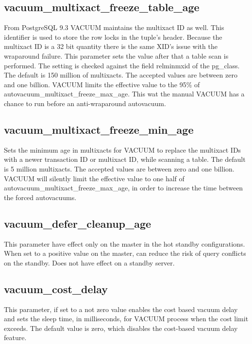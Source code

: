 \subsection{vacuum\_multixact\_freeze\_table\_age}
From PostgreSQL 9.3 VACUUM maintains the multixact ID as well. This identifier is used to store the 
row locks in the tuple's header.  Because the multixact ID is a 32 bit quantity there 
is the same XID's issue with the wraparound failure. This parameter 
sets the value after that a table scan is performed. The setting is checked against the field relminmxid of 
the pg\_class. The default is 150 million of multixacts. The accepted values are between zero and one 
billion. VACUUM limits the effective value to the 95\% of autovacuum\_multixact\_freeze\_max\_age. This wat 
the manual VACUUM has a chance to run before an anti-wraparound autovacuum.

\subsection{vacuum\_multixact\_freeze\_min\_age}
Sets the minimum age in multixacts for VACUUM to replace the multixact IDs with a newer transaction ID or 
multixact ID, while scanning a table. The default is 5 million multixacts. The accepted values 
are between zero and one billion. VACUUM will silently limit the effective value to one half of 
autovacuum\_multixact\_freeze\_max\_age, in order to increase the time between the forced autovacuums.

\subsection{vacuum\_defer\_cleanup\_age}
This parameter have effect only on the master in the hot standby configurations. When set to a positive  
value on the master, can reduce the risk of query conflicts on the standby. Does not have effect on a 
standby server.

\subsection{vacuum\_cost\_delay}\label{sub:VACUUMCOST}
This parameter, if set to a not zero value enables the cost based vacuum delay and sets the sleep time, in milliseconds, for VACUUM process when the cost limit exceeds. The 
default value is zero, which disables the cost-based vacuum delay feature. 


